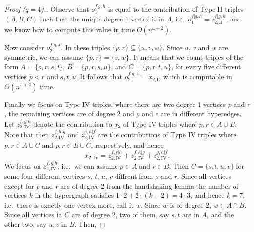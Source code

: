 \documentclass{amsart}
\begin{document}
\begin{proof}[Proof ($q=4$).]
Observe that $o^{f|g,h}_1$ is equal to the contribution of Type II triples $(A,B,C)$ such that the unique degree $1$ vertex is in $A$, i.e.\ 
$o^{f|g,h}_1 = z_{2,\mathrm{II}}^{f|g,h}$, and we know how to compute this value in time $O(n^{\omega+2})$.

Now consider $o^{f|g,h}_2$. In these triples $\{p,r\}\subseteq\{u,v,w\}$.
Since $u$, $v$ and $w$ are symmetric, we can assume $\{p,r\}=\{v,w\}$.
It means that we count triples of the form $A=\{p,r,s,t\}$, $B=\{p,r,s,u\}$, and $C=\{p,r,t,u\}$, for every five different vertices $p<r$ and $s,t,u$.
It follows that $o^{f|g,h}_2=x_{2,\mathrm{I}}$, which is computable in $O(n^{\omega+2})$ time.

Finally we focus on Type IV triples, where there are two degree $1$ vertices $p$ and $r$, the remaining vertices are of degree 2 and $p$ and $r$ are in different hyperedges. Let $z_{2,\mathrm{IV}}^{f,g|h}$ denote the contribution to $x_2$ of Type IV triples where $p,r\in A\cup B$.
Note that then $z_{2,\mathrm{IV}}^{f,h|g}$ and $z_{2,\mathrm{IV}}^{g,h|f}$ are the contributions of Type IV triples where $p,r\in A\cup C$ and $p,r\in B\cup C$, respectively, and hence 
\begin{equation}
\label{eq:4-uniform-type-IV}
 x_{2,\mathrm{IV}}=z_{2,\mathrm{IV}}^{f,g|h}+z_{2,\mathrm{IV}}^{f,h|g}+z_{2,\mathrm{IV}}^{g,h|f}.
\end{equation}
We focus on $z_{2,\mathrm{IV}}^{f,g|h}$, i.e.\ we can assume $p\in A$ and $r\in B$. 
Then $C=\{s,t,u,v\}$ for some four different vertices $s$, $t$, $u$, $v$ diffrent from $p$ and $r$. Since all vertices except for $p$ and $r$ are of degree 2 from the handshaking lemma the number of vertices $k$ in the hypergraph satisfies $1\cdot 2+2\cdot (k-2)=4\cdot 3$, and hence $k=7$, i.e.\ there is exactly one vertex more, call it $w$.
Since $w$ is of degree 2, $w\in A\cap B$. Since all vertices in $C$ are of degree 2, two of them, say $s,t$ are in $A$, and the other two, say $u,v$ in $B$. Then,


\end{proof}
\end{document}
